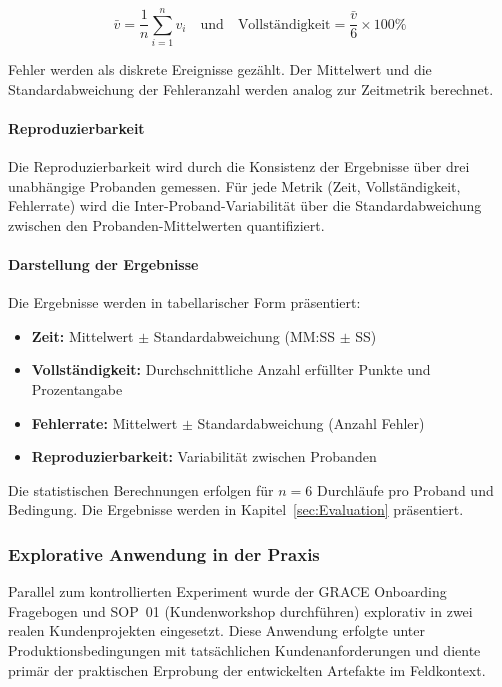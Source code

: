\[
\bar{v} = \frac{1}{n} \sum_{i=1}^{n} v_i \quad \text{und} \quad \text{Vollständigkeit} = \frac{\bar{v}}{6} \times 100\%
\]

Fehler werden als diskrete Ereignisse gezählt. Der Mittelwert und die Standardabweichung der Fehleranzahl werden analog zur Zeitmetrik berechnet.

\paragraph{Reproduzierbarkeit}

Die Reproduzierbarkeit wird durch die Konsistenz der Ergebnisse über drei unabhängige Probanden gemessen. Für jede Metrik (Zeit, Vollständigkeit, Fehlerrate) wird die Inter-Proband-Variabilität über die Standardabweichung zwischen den Probanden-Mittelwerten quantifiziert.

\paragraph{Darstellung der Ergebnisse}

Die Ergebnisse werden in tabellarischer Form präsentiert:

\begin{itemize}
    \item \textbf{Zeit:} Mittelwert $\pm$ Standardabweichung (MM:SS $\pm$ SS)
    \item \textbf{Vollständigkeit:} Durchschnittliche Anzahl erfüllter Punkte und Prozentangabe
    \item \textbf{Fehlerrate:} Mittelwert $\pm$ Standardabweichung (Anzahl Fehler)
    \item \textbf{Reproduzierbarkeit:} Variabilität zwischen Probanden
\end{itemize}

Die statistischen Berechnungen erfolgen für $n = 6$ Durchläufe pro Proband und Bedingung. Die Ergebnisse werden in Kapitel~\ref{sec:Evaluation} präsentiert.

\subsubsection{Explorative Anwendung in der Praxis}
\label{subsubsec:ExplorativeAnwendung}

Parallel zum kontrollierten Experiment wurde der GRACE Onboarding Fragebogen und SOP~01 (Kundenworkshop durchführen) explorativ in zwei realen Kundenprojekten eingesetzt. Diese Anwendung erfolgte unter Produktionsbedingungen mit tatsächlichen Kundenanforderungen und diente primär der praktischen Erprobung der entwickelten Artefakte im Feldkontext.

